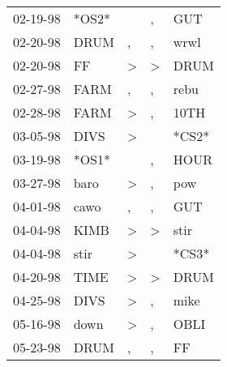 \begin{supertabular}{p{0.07\textwidth}p{0.06\textwidth}p{0.02\textwidth}p{0.02\textwidth}p{0.06\textwidth}}
 02-19-98\textsuperscript{} &                            *OS2* &               &             , &   GUT\textsuperscript{} \\
 02-20-98\textsuperscript{} &           DRUM\textsuperscript{} &             , &             , &  wrwl\textsuperscript{} \\
 02-20-98\textsuperscript{} &             FF\textsuperscript{} &  \textgreater &  \textgreater &  DRUM\textsuperscript{} \\
 02-27-98\textsuperscript{} &           FARM\textsuperscript{} &             , &             , &  rebu\textsuperscript{} \\
 02-28-98\textsuperscript{} &           FARM\textsuperscript{} &  \textgreater &             , &  10TH\textsuperscript{} \\
 03-05-98\textsuperscript{} &           DIVS\textsuperscript{} &  \textgreater &               &                   *CS2* \\
 03-19-98\textsuperscript{} &                            *OS1* &               &             , &  HOUR\textsuperscript{} \\
 03-27-98\textsuperscript{} &           baro\textsuperscript{} &  \textgreater &             , &   pow\textsuperscript{} \\
 04-01-98\textsuperscript{} &           cawo\textsuperscript{} &             , &             , &   GUT\textsuperscript{} \\
 04-04-98\textsuperscript{} &           KIMB\textsuperscript{} &  \textgreater &  \textgreater &  stir\textsuperscript{} \\
 04-04-98\textsuperscript{} &           stir\textsuperscript{} &  \textgreater &               &                   *CS3* \\
 04-20-98\textsuperscript{} &           TIME\textsuperscript{} &  \textgreater &  \textgreater &  DRUM\textsuperscript{} \\
 04-25-98\textsuperscript{} &           DIVS\textsuperscript{} &  \textgreater &             , &  mike\textsuperscript{} \\
 05-16-98\textsuperscript{} &           down\textsuperscript{} &  \textgreater &             , &  OBLI\textsuperscript{} \\
 05-23-98\textsuperscript{} &           DRUM\textsuperscript{} &             , &             , &    FF\textsuperscript{} \\

\end{supertabular}
